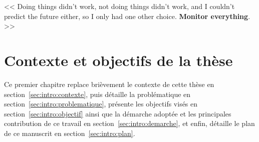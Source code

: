 \begin{savequote}[6cm]
<< Doing things didn't work, not doing things didn't work, and I couldn't predict the future either, so I only had one other choice. \textbf{Monitor everything}. >>
\end{savequote}
\chapter{Contexte et objectifs de la thèse}
\chaptertoc


Ce premier chapitre replace brièvement le contexte de cette thèse en section~\ref{sec:intro:contexte}, puis détaille la problématique en section~\ref{sec:intro:problematique}, présente les objectifs visés en section~\ref{sec:intro:objectif} ainsi que la démarche adoptée et les principales contribution de ce travail en section~\ref{sec:intro:demarche}, et enfin, détaille le plan de ce manuscrit en section~\ref{sec:intro:plan}.






